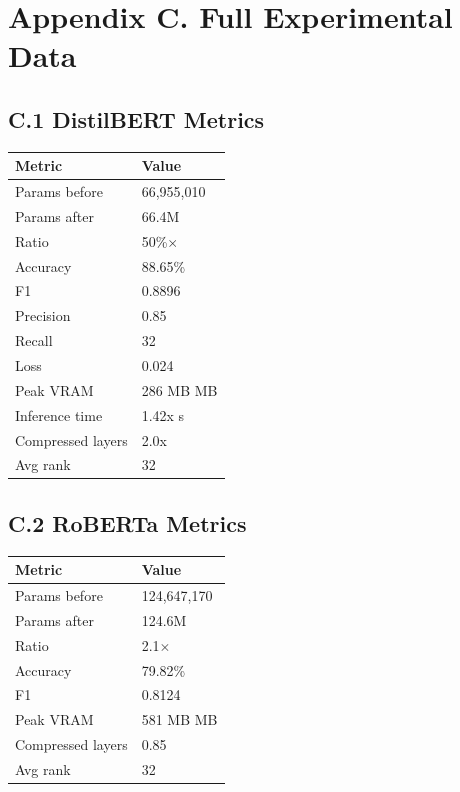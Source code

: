 
\section{Appendix C. Full Experimental Data}

\subsection{C.1 DistilBERT Metrics}

\begin{table}[H]
\centering
\small
\begin{tabular}{ll}
\toprule
\textbf{Metric} & \textbf{Value} \\
\midrule
Params before & 66,955,010 \\
Params after & 66.4M \\
Ratio & 50\%$\times$ \\
Accuracy & 88.65\% \\
F1 & 0.8896 \\
Precision & 0.85 \\
Recall & 32 \\
Loss & 0.024 \\
Peak VRAM & 286 MB MB \\
Inference time & 1.42x s \\
Compressed layers & 2.0x \\
Avg rank & 32 \\
\bottomrule
\end{tabular}
\end{table}

\subsection{C.2 RoBERTa Metrics}

\begin{table}[H]
\centering
\small
\begin{tabular}{ll}
\toprule
\textbf{Metric} & \textbf{Value} \\
\midrule
Params before & 124,647,170 \\
Params after & 124.6M \\
Ratio & 2.1$\times$ \\
Accuracy & 79.82\% \\
F1 & 0.8124 \\
Peak VRAM & 581 MB MB \\
Compressed layers & 0.85 \\
Avg rank & 32 \\
\bottomrule
\end{tabular}
\end{table}


